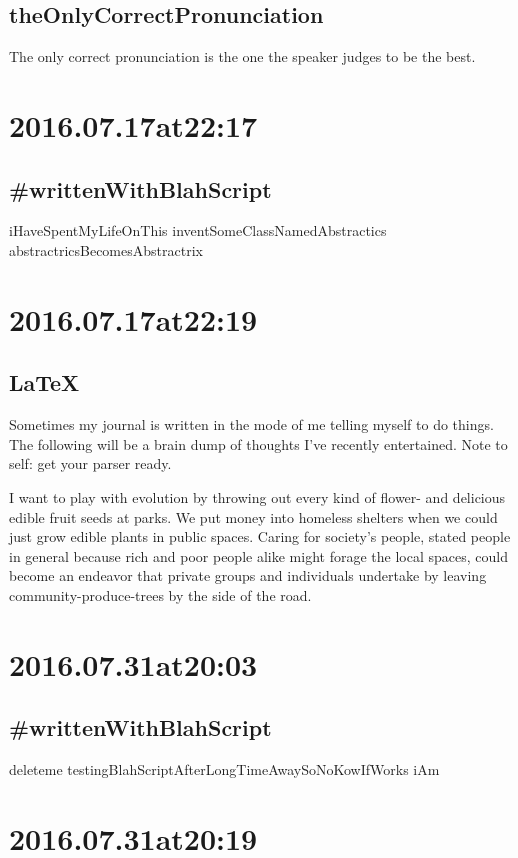 \subsection*{theOnlyCorrectPronunciation}
The only correct pronunciation is the one the speaker judges to be the best.


\section*{ 2016.07.17at22:17 }
\subsection*{\#writtenWithBlahScript }
iHaveSpentMyLifeOnThis inventSomeClassNamedAbstractics abstractricsBecomesAbstractrix

\section*{ 2016.07.17at22:19 }
\subsection*{LaTeX}
Sometimes my journal is written in the mode of me telling myself to do things. The following will be a brain dump of thoughts I've recently entertained. Note to self: get your parser ready.

I want to play with evolution by throwing out every kind of flower- and delicious edible fruit seeds at parks. We put money into homeless shelters when we could just grow edible plants in public spaces. Caring for society's people, stated people in general because rich and poor people alike might forage the local spaces, could become an endeavor that private groups and individuals undertake by leaving community-produce-trees by the side of the road.

\section*{ 2016.07.31at20:03 }
\subsection*{\#writtenWithBlahScript }
deleteme testingBlahScriptAfterLongTimeAwaySoNoKowIfWorks iAm

\section*{ 2016.07.31at20:19 }
